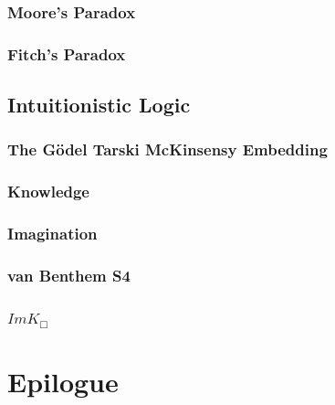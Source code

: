 \documentclass[11pt]{article}
\numberwithin{equation}{subsection}
\begin{document}
\subsubsection{Moore's Paradox}
\subsubsection{Fitch's Paradox}
\subsection{Intuitionistic Logic}
\subsubsection{The G\"{o}del Tarski McKinsensy Embedding}
\subsubsection{Knowledge}
\subsubsection{Imagination}
\subsubsection{van Benthem \textsc{S4}}
\subsubsection{$ImK_\Box$}



\section{Epilogue}\label{epilogue}
\end{document}
